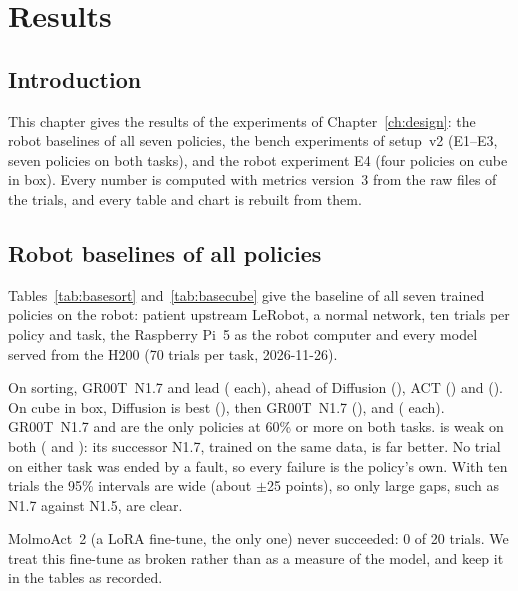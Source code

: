 \chapter{Results}\label{ch:results}

\section{Introduction}
This chapter gives the results of the experiments of Chapter~\ref{ch:design}: the robot baselines of all seven policies,
the bench experiments of setup~v2 (E1--E3, seven policies on both tasks), and the robot experiment E4 (four
policies on cube in box). Every number is computed with metrics version~3 from
the raw files of the trials, and every table and chart is rebuilt from them.

\section{Robot baselines of all policies}\label{sec:baselines}

Tables~\ref{tab:basesort} and~\ref{tab:basecube} give the baseline of all seven trained policies on the robot:
patient upstream LeRobot, a normal network, ten trials per policy and task, the Raspberry Pi~5 as the robot computer
and every model served from the H200 (70 trials per task, 2026-11-26).

On sorting, GR00T~N1.7 and \smolvla{} lead ( each), ahead of Diffusion (), ACT
() and \pizerofive{} (). On cube in box,
Diffusion is best (), then GR00T~N1.7
(), \pizerofive{} and \smolvla{} (
each). GR00T~N1.7 and \smolvla{} are the only policies at 60\% or more on both tasks. \groot{} is weak on both
( and ): its successor N1.7, trained on the
same data, is far better. No trial on either task was ended by a fault, so every failure
is the policy's own. With ten trials the 95\% intervals are wide (about $\pm$25 points), so only large gaps, such as
N1.7 against N1.5, are clear.

MolmoAct~2 (a LoRA fine-tune, the only one) never succeeded: 0 of 20 trials. We treat this fine-tune as broken rather
than as a measure of the model, and keep it in the tables as recorded.

